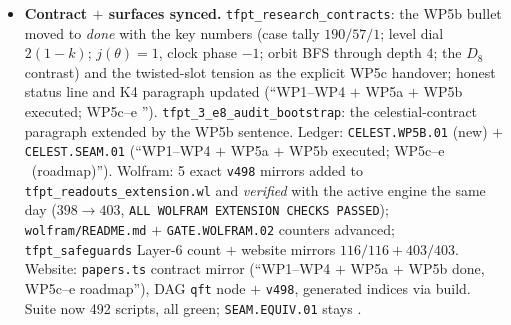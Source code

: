 \begin{itemize}[leftmargin=1.5em]
$2\theta$ has multiplicity $1$ in the level-$2$ Fock, so $U(\mathfrak g)|s\rangle$ is \emph{the}
$27000=(h^\vee)^3$; the direct $\mathfrak g_0$-orbit BFS matches the Freudenthal multiplicities of
$V(2\theta)$ exactly through depth $4$ (\mC\ Weyl complete reducibility beyond); quotient
$31124-27000=4124$; lattice reading $(2\theta,2\theta)/2=4>2$: $|s\rangle$ \emph{is} the kernel
generator of Fock $\to E_4/\eta^8$. \emph{Negative controls (honest separation)}: the level-$1$
current state $E^\theta_{-1}|0\rangle$ (one witness, $\to-k|0\rangle$ --- the $248$-current state that
must remain) and $4$ generic level-$2$ states ($14$--$33$ witnesses) are \emph{not} singular; at
$k{=}2$ the \emph{cube} is (generic Kac $(E^\theta)^{k+1}$ mechanics, honestly typed); $SO(16)_1$ has
the same singular vector but keeps three extra level-$1$ primaries ($h=\tfrac12$ breaks one-block
fusion; $5304\neq14^3$) vs $E_8$ (comarks all $\ge2$, glue weights $(0,1,1,1)$ integer) --- the
\emph{one-block closure} is the $E_8/\mu_4$-specific part. \emph{Honest} \mO: in the twisted
quarter-slot moding two sector-$C_1$ modes never sum to $8$ quarters (minimum $6=q^{3/2}$) --- the
per-period dictionary (\texttt{v496}), not the per-slot identification, carries $|s\rangle$ to $q^2$:
exactly the WP5c GNS/limit-state question; WP5c--e stay open; \texttt{SEAM.EQUIV.01} untouched.
\item \textbf{Contract $+$ surfaces synced.} \texttt{tfpt\_research\_contracts}: the WP5b bullet moved
to \emph{done} with the key numbers (case tally $190/57/1$; level dial $2(1{-}k)$; $j(\theta)=1$, clock
phase $-1$; orbit BFS through depth $4$; the $D_8$ contrast) and the twisted-slot tension as the
explicit WP5c handover; honest status line and K4 paragraph updated (``WP1--WP4 $+$ WP5a $+$ WP5b
executed; WP5c--e \mO''). \texttt{tfpt\_3\_e8\_audit\_bootstrap}: the celestial-contract paragraph
extended by the WP5b sentence. Ledger: \texttt{CELEST.WP5B.01} (new) $+$ \texttt{CELEST.SEAM.01}
(``WP1--WP4 $+$ WP5a $+$ WP5b executed; WP5c--e \mO\ (roadmap)''). Wolfram: 5 exact \texttt{v498}
mirrors added to \texttt{tfpt\_readouts\_extension.wl} and \emph{verified} with the active engine the
same day ($398\to403$, \texttt{ALL WOLFRAM EXTENSION CHECKS PASSED}); \texttt{wolfram/README.md} $+$
\texttt{GATE.WOLFRAM.02} counters advanced; \texttt{tfpt\_safeguards} Layer-6 count $+$ website mirrors
$116/116+403/403$. Website: \texttt{papers.ts} contract mirror (``WP1--WP4 $+$ WP5a $+$ WP5b done,
WP5c--e roadmap''), DAG \texttt{qft} node $+$ \texttt{v498}, generated indices via build. Suite now
492 scripts, all green; \texttt{SEAM.EQUIV.01} stays \mO.
\end{itemize}

